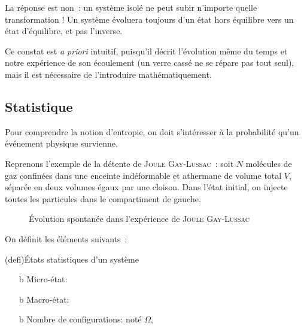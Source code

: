 \documentclass[../../main/main.tex]{subfiles}
\begin{document}
La réponse est non~: un système isolé ne peut subir n'importe quelle
transformation ! Un système évoluera toujours d'un état hors équilibre vers un
état d'équilibre, et pas l'inverse.

Ce constat est \textit{a priori} intuitif, puisqu'il décrit l'évolution même du
temps et notre expérience de son écoulement (un verre cassé ne se répare pas
tout seul), mais il est nécessaire de l'introduire mathématiquement.

\subsection{Statistique}
Pour comprendre la notion d'entropie, on doit s'intéresser à la probabilité
qu'un événement physique survienne.

Reprenons l'exemple de la détente de \textsc{Joule Gay-Lussac}~:
soit $N$ molécules de gaz confinées dans une enceinte indéformable et athermane
de volume total $V$, séparée en deux volumes égaux par une cloison. Dans l'état
initial, on injecte toutes les particules dans le compartiment de gauche.

\begin{figure}[htbp!]
	\caption{Évolution spontanée dans l'expérience de \textsc{Joule Gay-Lussac}}
\end{figure}

On définit les éléments suivants~:
\begin{tcb}(defi){États statistiques d'un système}
	\begin{itemize}
		\item[b]{Micro-état}: 
		\item[b]{Macro-état}: 
		\item[b]{Nombre de configurations}: noté $\Omega$, 
	\end{itemize}
\end{tcb}
\end{document}
